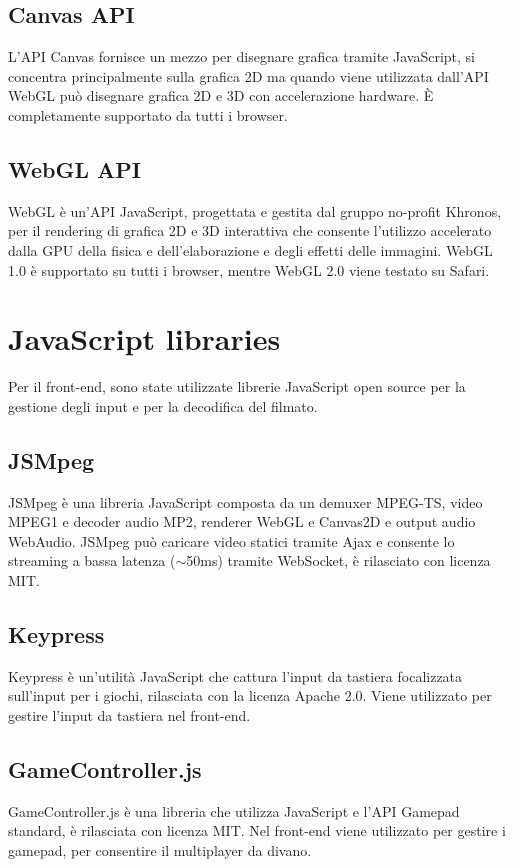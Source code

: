 \subsection{Canvas API}
L'API Canvas fornisce un mezzo per disegnare grafica tramite JavaScript, si concentra principalmente sulla grafica 2D ma quando viene utilizzata dall'API WebGL può disegnare grafica 2D e 3D con accelerazione hardware. È completamente supportato da tutti i browser\cite{Canvas_API}.

\subsection{WebGL API}
WebGL è un'API JavaScript, progettata e gestita dal gruppo no-profit Khronos, per il rendering di grafica 2D e 3D interattiva che consente l'utilizzo accelerato dalla GPU della fisica e dell'elaborazione e degli effetti delle immagini. WebGL 1.0 è supportato su tutti i browser, mentre WebGL 2.0 viene testato su Safari\cite{WebGL}.



\section{JavaScript libraries}
Per il front-end, sono state utilizzate librerie JavaScript open source per la gestione degli input e per la decodifica del filmato.

\subsection{JSMpeg}
JSMpeg è una libreria JavaScript composta da un demuxer MPEG-TS, video MPEG1 e decoder audio MP2, renderer WebGL e Canvas2D e output audio WebAudio. JSMpeg può caricare video statici tramite Ajax e consente lo streaming a bassa latenza ($\sim$50ms) tramite WebSocket, è rilasciato con licenza MIT\cite{JSMpeg}.

\subsection{Keypress}
Keypress è un'utilità JavaScript che cattura l'input da tastiera focalizzata sull'input per i giochi, rilasciata con la licenza Apache 2.0. Viene utilizzato per gestire l'input da tastiera nel front-end\cite{Keypress}.

\subsection{GameController.js}
GameController.js è una libreria che utilizza JavaScript e l'API Gamepad standard, è rilasciata con licenza MIT. Nel front-end viene utilizzato per gestire i gamepad, per consentire il multiplayer da divano\cite{gameController_js}.